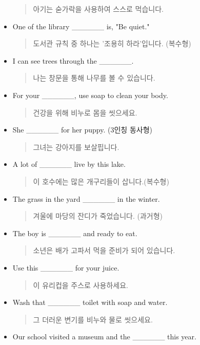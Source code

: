 \documentclass{article}
\begin{document}
\begin{addmargin}[1em]{1em}
\begin{itemize}
    \begin{quote}
    아기는 숟가락을 사용하여 스스로 먹습니다.
    \end{quote}
    \item One of the library \_\_\_\_\_\_ is, "Be quiet."
    \begin{quote}
    도서관 규칙 중 하나는 '조용히 하라'입니다. (복수형)
    \end{quote}
    \item I can see trees through the \_\_\_\_\_\_.
    \begin{quote}
    나는 창문을 통해 나무를 볼 수 있습니다.
    \end{quote}
    \item For your \_\_\_\_\_\_, use soap to clean your body.
    \begin{quote}
    건강을 위해 비누로 몸을 씻으세요.
    \end{quote}
    \item She \_\_\_\_\_\_ for her puppy. (3인칭 동사형)
    \begin{quote}
    그녀는 강아지를 보살핍니다.
    \end{quote}
    \newpage
    \item A lot of \_\_\_\_\_\_ live by this lake.
    \begin{quote}
    이 호수에는 많은 개구리들이 삽니다.(복수형)
    \end{quote}
    \item The grass in the yard \_\_\_\_\_\_ in the winter.
    \begin{quote}
    겨울에 마당의 잔디가 죽었습니다. (과거형)
    \end{quote}
    \item The boy is \_\_\_\_\_\_ and ready to eat.
    \begin{quote}
    소년은 배가 고파서 먹을 준비가 되어 있습니다.
    \end{quote}
    \item Use this \_\_\_\_\_\_ for your juice.
    \begin{quote}
    이 유리컵을 주스로 사용하세요.
    \end{quote}
    \item Wash that \_\_\_\_\_\_ toilet with soap and water.
    \begin{quote}
    그 더러운 변기를 비누와 물로 씻으세요.
    \end{quote}
    \item Our school visited a museum and the \_\_\_\_\_\_ this year.
    \begin{quote}

\end{quote}
\end{itemize}
\end{addmargin}
\end{document}
